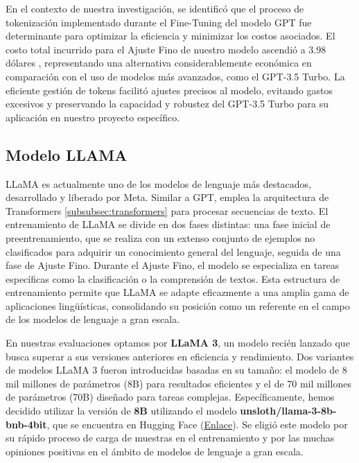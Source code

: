 En el contexto de nuestra investigación, se identificó que el proceso de tokenización implementado durante el Fine-Tuning del modelo \acrshort{GPT} fue determinante para optimizar la eficiencia y minimizar los costos asociados. El costo total incurrido para el Ajuste Fino de nuestro modelo ascendió a 3.98 dólares \cite{APIOpenApi}, representando una alternativa considerablemente económica en comparación con el uso de modelos más avanzados, como el GPT-3.5 Turbo. La eficiente gestión de tokens facilitó ajustes precisos al modelo, evitando gastos excesivos y preservando la capacidad y robustez del \acrshort{GPT}-3.5 Turbo para su aplicación en nuestro proyecto específico.

\subsection{Modelo LLAMA}

\acrshort{LLaMA} es actualmente uno de los modelos de lenguaje más destacados, desarrollado y liberado por Meta. Similar a \acrshort{GPT}, emplea la arquitectura de Transformers \ref{subsubsec:transformers} para procesar secuencias de texto. El entrenamiento de \acrshort{LLaMA} se divide en dos fases distintas: una fase inicial de preentrenamiento, que se realiza con un extenso conjunto de ejemplos no clasificados para adquirir un conocimiento general del lenguaje, seguida de una fase de Ajuste Fino. Durante el Ajuste Fino, el modelo se especializa en tareas específicas como la clasificación o la comprensión de textos. Esta estructura de entrenamiento permite que \acrshort{LLaMA}  se adapte eficazmente a una amplia gama de aplicaciones lingüísticas, consolidando su posición como un referente en el campo de los modelos de lenguaje a gran escala.

\bigskip %
En nuestras evaluaciones optamos por \textbf{LLaMA 3}, un modelo recién lanzado que busca superar a sus versiones anteriores en eficiencia y rendimiento. Dos variantes de modelos \acrshort{LLaMA} 3 fueron introducidas basadas en su tamaño: el modelo de 8 mil millones de parámetros (8B) para resultados eficientes y el de 70 mil millones de parámetros (70B) diseñado para tareas complejas. Específicamente, hemos decidido utilizar la versión de \textbf{8B} utilizando el modelo \textbf{unsloth/llama-3-8b-bnb-4bit}, que se encuentra en Hugging Face (\href{https://huggingface.co/unsloth/llama-3-8b-bnb-4bit}{Enlace}).
Se eligió este modelo por su rápido proceso de carga de muestras en el entrenamiento y por las muchas opiniones positivas en el ámbito de modelos de lenguaje a gran escala.

